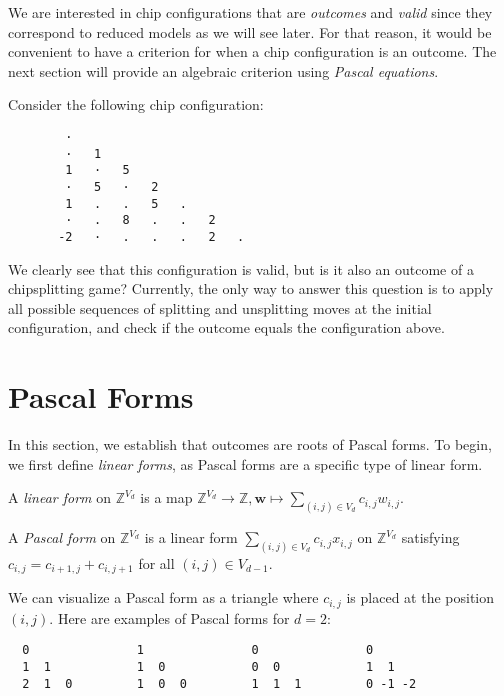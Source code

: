 We are interested in chip configurations that are \emph{outcomes} and \emph{valid} since they correspond to reduced models as we will see later. For that reason, it would be convenient to have a criterion for when a chip configuration is an outcome. The next section will provide an algebraic criterion using \emph{Pascal equations}.

\begin{example}\label{ex:dknfkdjsfnsdj}
    Consider the following chip configuration:
    \begin{verbatim}
        · 
        ·   1 
        1   ·   5 
        ·   5   ·   2 
        1   .   .   5   . 
        ·   .   8   .   .   2 
       -2   ·   .   .   .   2   . 
    \end{verbatim}
    We clearly see that this configuration is valid, but is it also an outcome of a chipsplitting game? Currently, the only way to answer this question is to apply all possible sequences of splitting and unsplitting moves at the initial configuration, and check if the outcome equals the configuration above.
\end{example}



\section{Pascal Forms}

In this section, we establish that outcomes are roots of Pascal forms. To begin, we first define \emph{linear forms}, as Pascal forms are a specific type of linear form.

\begin{definition}
    A \emph{linear form} on \( \mathbb{Z}^{V_d} \) is a map \( \mathbb{Z}^{V_d} \to \mathbb{Z}, \mathbf{w} \mapsto \sum_{(i,j) \in V_d} c_{i,j} w_{i,j} \).
\end{definition}

\begin{definition}
    A \emph{Pascal form} on \( \mathbb{Z}^{V_d} \) is a linear form \( \sum_{(i,j) \in V_d} c_{i,j} x_{i,j} \) on \( \mathbb{Z}^{V_d} \) satisfying \( c_{i,j} = c_{i+1,j} + c_{i,j+1}\) for all $(i,j) \in V_{d-1}$.
\end{definition}

\begin{example}
    We can visualize a Pascal form as a triangle where \( c_{i,j} \) is placed at the position \( (i,j) \). Here are examples of Pascal forms for \( d = 2 \):
    \begin{verbatim}
  0               1               0               0
  1  1            1  0            0  0            1  1
  2  1  0         1  0  0         1  1  1         0 -1 -2
    \end{verbatim}
\end{example}

